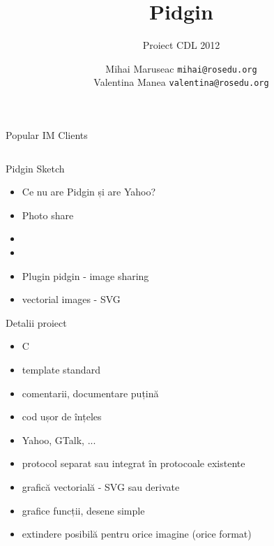 \documentclass{beamer}
\title[]{Pidgin}
\subtitle{Proiect CDL 2012}
\institute[]{ROSEdu}
\author[]{
  Mihai Maruseac \texttt{mihai@rosedu.org} \\
  Valentina Manea \texttt{valentina@rosedu.org}
}
\begin{document}
\maketitle

\begin{frame}{Popular IM Clients}
  \begin{columns}[c]
    \column{1.5in}
    \column{1.5in}
  \end{columns}
\end{frame}

\begin{frame}{Pidgin Sketch}
  \begin{itemize}
    \item Ce nu are Pidgin și are Yahoo?
    \item <2-> Photo share
    \item <0> 
    \item <0>
    \item <3->Plugin pidgin - image sharing
    \item <4->vectorial images - SVG
  \end{itemize}
\end{frame}

\begin{frame}{Detalii proiect}
  \begin{itemize}
    \item C
    \item template standard
    \item comentarii, documentare puțină
    \item cod ușor de înțeles
    \item <2-> Yahoo, GTalk, ...
    \item <3-> protocol separat sau integrat în protocoale existente
    \item <4-> grafică vectorială - SVG sau derivate
    \item <5-> grafice funcții, desene simple
    \item <6-> extindere posibilă pentru orice imagine (orice format)
  \end{itemize}
\end{frame}
\end{document}
